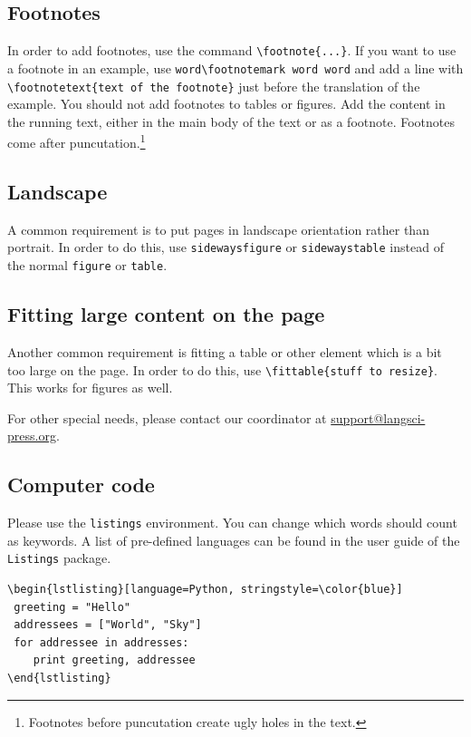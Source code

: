 \subsection{Footnotes}
In order to add footnotes, use the command \verb+\footnote{...}+. If you want to use a footnote in an example, use \verb+word\footnotemark word word+ and add a line with \verb+\footnotetext{text of the footnote}+ just before the translation of the example. You should not add footnotes to tables or figures. Add the content in the running text, either in the main body of the text or as a footnote. Footnotes come after puncutation.\footnote{Footnotes before puncutation create ugly holes in the text.}

\newpage
\subsection{Landscape}

A common requirement is to put pages in landscape orientation rather than portrait. In order to do this, use \verb+sidewaysfigure+ or \verb+sidewaystable+ instead of the normal \verb+figure+ or \verb+table+.

\subsection{Fitting large content on the page}
Another common requirement is fitting a table or other element which is a bit too large on the page. In order to do this, use \verb+\fittable{stuff to resize}+. This works for figures as well.

For other special needs, please contact our coordinator at \url{support@langsci-press.org}.

\subsection{Computer code}
Please use the \verb+listings+ environment. You can change which words should count as keywords. A list of pre-defined languages can be found in the user guide of the \verb+Listings+ package.

\begin{verbatim}
\begin{lstlisting}[language=Python, stringstyle=\color{blue}]
 greeting = "Hello"
 addressees = ["World", "Sky"]
 for addressee in addresses:
    print greeting, addressee
\end{lstlisting}
\end{verbatim}

